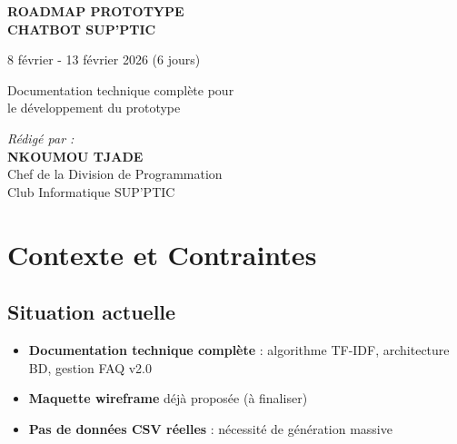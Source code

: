 \documentclass[11pt,a4paper]{article}
\begin{document}
\begin{titlepage}
    \centering
    \vspace*{2cm}
    {\Huge \textbf{ROADMAP PROTOTYPE}} \\[0.5cm]
    {\LARGE \textbf{CHATBOT SUP'PTIC}} 
    
    \vspace{1cm}
    
    {\Large 8 février - 13 février 2026 (6 jours)}
    
    \vspace{1.5cm}
    
    \begin{minipage}{0.8\textwidth}
        \centering
        \small Documentation technique complète pour \\
        le développement du prototype
    \end{minipage}
    
    \vfill
    
    \begin{center}
        \textit{Rédigé par :} \\
        \vspace{0.3cm}
        \textbf{NKOUMOU TJADE} \\
        Chef de la Division de Programmation \\
        Club Informatique SUP'PTIC
    \end{center}
    
\end{titlepage}

\tableofcontents
\clearpage

\section{Contexte et Contraintes}
\label{sec:contexte}

\subsection{Situation actuelle}

\begin{itemize}
    \item[\faIcon{check-circle}] \textbf{Documentation technique complète} : algorithme TF-IDF, architecture BD, gestion FAQ v2.0
    \item[\faIcon{check-circle}] \textbf{Maquette wireframe} déjà proposée (à finaliser)
    \item[\faIcon{times-circle}] \textbf{Pas de données CSV réelles} : nécessité de génération massive
\end{itemize}
\end{document}
